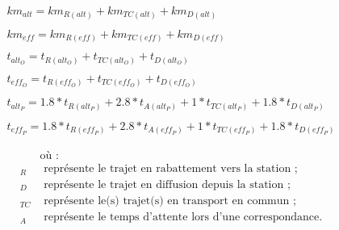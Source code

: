\begin{refsegment}
    \begin{equation}
    \label{equation-chap5:effectif-alternatif}
    \begin{array}{lclclclclclcl}
    \displaystyle km_{alt} = km_{R(alt)} + km_{TC(alt)} + km_{D(alt)}\\\\
    \displaystyle km_{eff} = km_{R(eff)} + km_{TC(eff)} + km_{D(eff)}\\\\
    \displaystyle t_{alt_O} = t_{R(alt_O)} + t_{TC(alt_O)} + t_{D(alt_O)}\\\\
    \displaystyle t_{eff_O} = t_{R(eff_O)} + t_{TC(eff_O)} + t_{D(eff_O)}\\\\
    \displaystyle t_{alt_P} = 1.8*t_{R(alt_P)} + 2.8*t_{A(alt_P)} + 1*t_{TC(alt_P)} + 1.8*t_{D(alt_P)}\\\\
    \displaystyle t_{eff_P} = 1.8*t_{R(eff_P)} + 2.8*t_{A(eff_P)} + 1*t_{TC(eff_P)} + 1.8*t_{D(eff_P)}
    \end{array}
    \end{equation}

\begin{align*}
    &\text{où~:} \\
    _R &\text{ représente le trajet en rabattement vers la station~;} \\
    _D &\text{ représente le trajet en diffusion depuis la station~;} \\
    _{TC} &\text{ représente le(s) trajet(s) en transport en commun~;} \\
    _A &\text{ représente le temps d'attente lors d'une correspondance.}
\end{align*}


\end{refsegment}
